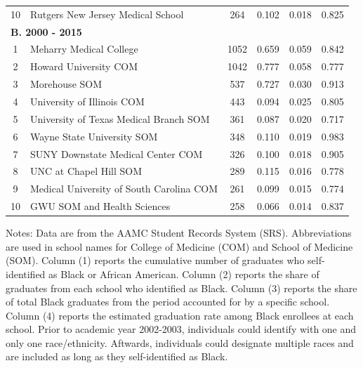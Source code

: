 \documentclass[12pt]{article}
\begin{document}
\begin{landscape}
\begin{table}[]
\begin{tabular}{clcccc}
  10 & Rutgers New Jersey Medical School        & 264  & 0.102 & 0.018 & 0.825                   \vspace{2mm} \\ 
  \multicolumn{2}{l}{\textbf{B. 2000 -   2015}}                             &                                  &                              &                                                   &                                  \\
  1  & Meharry Medical College                  & 1052 & 0.659 & 0.059 & 0.842 \\
  2  & Howard University COM                    & 1042 & 0.777 & 0.058 & 0.777 \\
  3  & Morehouse SOM                            & 537  & 0.727 & 0.030 & 0.913 \\
  4  & University of Illinois COM               & 443  & 0.094 & 0.025 & 0.805 \\
  5  & University of Texas Medical Branch SOM   & 361  & 0.087 & 0.020 & 0.717 \\
  6  & Wayne State University SOM               & 348  & 0.110 & 0.019 & 0.983 \\
  7  & SUNY Downstate Medical Center COM        & 326  & 0.100 & 0.018 & 0.905 \\
  8  & UNC at Chapel Hill SOM                   & 289  & 0.115 & 0.016 & 0.778 \\
  9  & Medical University of South Carolina COM & 261  & 0.099 & 0.015 & 0.774 \\
  10 & GWU SOM and Health Sciences              & 258  & 0.066 & 0.014 & 0.837             \\
  \hline \hline       
  \end{tabular}
  \vspace{3mm}

  \begin{minipage}{1.15\textwidth}
    \footnotesize Notes: Data are from the AAMC Student Records System (SRS). Abbreviations are used in school names for College of Medicine (COM) and School of Medicine (SOM). Column (1) reports the cumulative number of graduates who self-identified as Black or African American. Column (2) reports the share of graduates from each school who identified as Black. Column (3) reports the share of total Black graduates from the period accounted for by a specific school. Column (4) reports the estimated graduation rate among Black enrollees at each school. Prior to academic year 2002-2003, individuals could identify with one and only one race/ethnicity. Aftwards, individuals could designate multiple races and are included as long as they self-identified as Black. 
    \end{minipage}
  \end{table}

\end{landscape}

\appendix

\setcounter{table}{0}
\renewcommand{\thetable}{A\arabic{table}}

\setcounter{figure}{0}
\renewcommand{\thefigure}{A\arabic{figure}}
\end{document}
